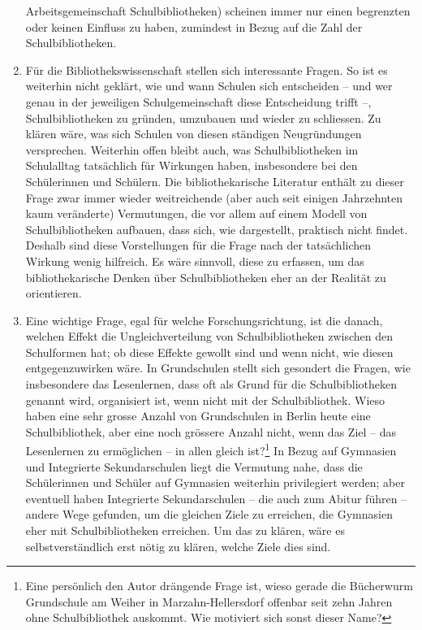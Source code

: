 \documentclass[a4paper,
fontsize=11pt,
oneside,
numbers=noperiodatend,
parskip=half-,
bibliography=totoc,
final
]{scrartcl}
\begin{document}
\begin{enumerate}
  Arbeitsgemeinschaft Schulbibliotheken) scheinen immer nur einen
  begrenzten oder keinen Einfluss zu haben, zumindest in Bezug auf die
  Zahl der Schulbibliotheken.
\item
  Für die Bibliothekswissenschaft stellen sich interessante Fragen. So
  ist es weiterhin nicht geklärt, wie und wann Schulen sich entscheiden
  -- und wer genau in der jeweiligen Schulgemeinschaft diese
  Entscheidung trifft --, Schulbibliotheken zu gründen, umzubauen und
  wieder zu schliessen. Zu klären wäre, was sich Schulen von diesen
  ständigen Neugründungen versprechen. Weiterhin offen bleibt auch, was
  Schulbibliotheken im Schulalltag tatsächlich für Wirkungen haben,
  insbesondere bei den Schülerinnen und Schülern. Die bibliothekarische
  Literatur enthält zu dieser Frage zwar immer wieder weitreichende
  (aber auch seit einigen Jahrzehnten kaum veränderte) Vermutungen, die
  vor allem auf einem Modell von Schulbibliotheken aufbauen, dass sich,
  wie dargestellt, praktisch nicht findet. Deshalb sind diese
  Vorstellungen für die Frage nach der tatsächlichen Wirkung wenig
  hilfreich. Es wäre sinnvoll, diese zu erfassen, um das
  bibliothekarische Denken über Schulbibliotheken eher an der Realität
  zu orientieren.
\item
  Eine wichtige Frage, egal für welche Forschungsrichtung, ist die
  danach, welchen Effekt die Ungleichverteilung von Schulbibliotheken
  zwischen den Schulformen hat; ob diese Effekte gewollt sind und wenn
  nicht, wie diesen entgegenzuwirken wäre. In Grundschulen stellt sich
  gesondert die Fragen, wie insbesondere das Lesenlernen, dass oft als
  Grund für die Schulbibliotheken genannt wird, organisiert ist, wenn
  nicht mit der Schulbibliothek. Wieso haben eine sehr grosse Anzahl von
  Grundschulen in Berlin heute eine Schulbibliothek, aber eine noch
  grössere Anzahl nicht, wenn das Ziel -- das Lesenlernen zu ermöglichen
  -- in allen gleich ist?\footnote{Eine persönlich den Autor drängende
    Frage ist, wieso gerade die Bücherwurm Grundschule am Weiher in
    Marzahn-Hellersdorf offenbar seit zehn Jahren ohne Schulbibliothek
    auskommt. Wie motiviert sich sonst dieser Name?} In Bezug auf
  Gymnasien und Integrierte Sekundarschulen liegt die Vermutung nahe,
  dass die Schülerinnen und Schüler auf Gymnasien weiterhin privilegiert
  werden; aber eventuell haben Integrierte Sekundarschulen -- die auch
  zum Abitur führen -- andere Wege gefunden, um die gleichen Ziele zu
  erreichen, die Gymnasien eher mit Schulbibliotheken erreichen. Um das
  zu klären, wäre es selbstverständlich erst nötig zu klären, welche
  Ziele dies sind.
\end{enumerate}
\end{document}
